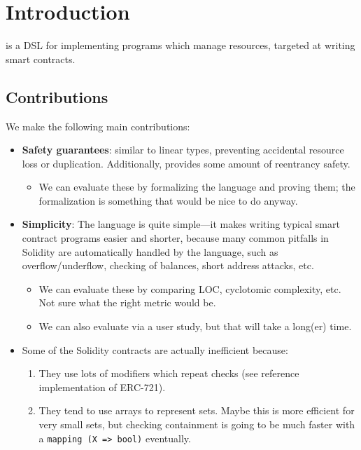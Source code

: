 \documentclass[10pt]{article}
\begin{document}
\section{Introduction}

\langName is a DSL for implementing programs which manage resources, targeted at writing smart contracts.

\subsection{Contributions}

We make the following main contributions:
\begin{itemize}
    \item \textbf{Safety guarantees}: similar to  linear types, preventing accidental resource loss or duplication.
        Additionally, provides some amount of reentrancy safety.

        \begin{itemize}
            \item We can evaluate these by formalizing the language and proving them; the formalization is something that would be nice to do anyway.
        \end{itemize}

    \item \textbf{Simplicity}: The language is quite simple---it makes writing typical smart contract programs easier and shorter, because many common pitfalls in Solidity are automatically handled by the language, such as overflow/underflow, checking of balances, short address attacks, etc.

        \begin{itemize}
            \item We can evaluate these by comparing LOC, cyclotomic complexity, etc.
                Not sure what the right metric would be.

            \item We can also evaluate via a user study, but that will take a long(er) time.
        \end{itemize}

    \item {}
        Some of the Solidity contracts are actually inefficient because:
        \begin{enumerate}
            \item They use lots of modifiers which repeat checks (see reference implementation of ERC-721).
            \item They tend to use arrays to represent sets.
                Maybe this is more efficient for very small sets, but checking containment is going to be much faster with a \lstinline{mapping (X => bool)} eventually.
        \end{enumerate}


\end{itemize}
\end{document}
